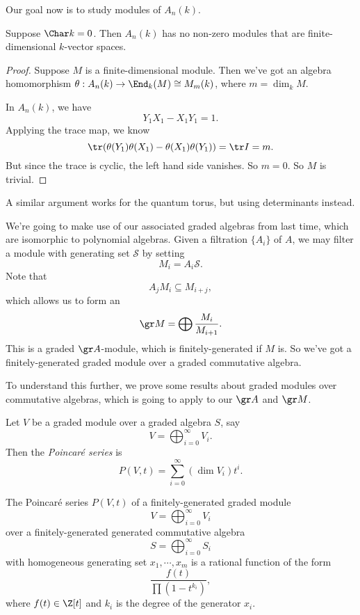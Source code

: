 \documentclass[a4paper]{article}
\begin{document}
Our goal now is to study modules of $A_n(k)$.
\begin{lemma}
  Suppose $\Char k = 0$. Then $A_n(k)$ has no non-zero modules that are finite-dimensional $k$-vector spaces.
\end{lemma}

\begin{proof}
  Suppose $M$ is a finite-dimensional module. Then we've got an algebra homomorphism $\theta: A_n(k) \to \End_k(M) \cong M_m(k)$, where $m = \dim_k M$.

  In $A_n(k)$, we have
  \[
    Y_1 X_1 - X_1 Y_1 = 1.
  \]
  Applying the trace map, we know
  \[
    \tr(\theta(Y_1) \theta(X_1) - \theta(X_1) \theta(Y_1)) = \tr I = m.
  \]
  But since the trace is cyclic, the left hand side vanishes. So $m = 0$. So $M$ is trivial.
\end{proof}
A similar argument works for the quantum torus, but using determinants instead.

We're going to make use of our associated graded algebras from last time, which are isomorphic to polynomial algebras. Given a filtration $\{A_i\}$ of $A$, we may filter a module with generating set $\mathcal{S}$ by setting
\[
  M_i = A_i \mathcal{S}.
\]
Note that
\[
  A_j M_i \subseteq M_{i + j},
\]
which allows us to form an 
\[
  \gr M = \bigoplus \frac{M_i}{M_{i + 1}}.
\]
This is a graded $\gr A$-module, which is finitely-generated if $M$ is. So we've got a finitely-generated graded module over a graded commutative algebra.

To understand this further, we prove some results about graded modules over commutative algebras, which is going to apply to our $\gr A$ and $\gr M$.
\begin{defi}
  Let $V$ be a graded module over a graded algebra $S$, say
  \[
    V = \bigoplus_{i = 0}^\infty V_i.
  \]
  Then the \emph{Poincar\'e series} is
  \[
    P(V, t) = \sum_{i = 0}^\infty (\dim V_i) t^i.
  \]
\end{defi}

\begin{thm}
  The Poincar\'e series $P(V, t)$ of a finitely-generated graded module
  \[
    V = \bigoplus_{i = 0}^\infty V_i
  \]
   over a finitely-generated generated commutative algebra
  \[
    S = \bigoplus_{i = 0}^\infty S_i
  \]
  with homogeneous generating set $x_1, \cdots, x_m$ is a rational function of the form
  \[
    \frac{f(t)}{\prod(1 - t^{k_i})},
  \]
  where $f(t) \in \Z[t]$ and $k_i$ is the degree of the generator $x_i$.
\end{thm}
\end{document}
